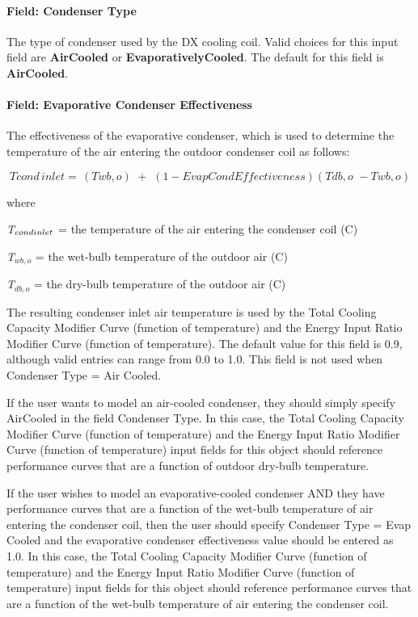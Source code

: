 \paragraph{Field: Condenser Type}\label{field-condenser-type-4}

The type of condenser used by the DX cooling coil. Valid choices for this input field are \textbf{AirCooled} or \textbf{EvaporativelyCooled}. The default for this field is \textbf{AirCooled}.

\paragraph{Field: Evaporative Condenser Effectiveness}\label{field-evaporative-condenser-effectiveness-1}

The effectiveness of the evaporative condenser, which is used to determine the temperature of the air entering the outdoor condenser coil as follows:

\begin{equation}
Tcond\,inlet = \,\left( {Twb,o} \right)\,\, + \,\,\left( {1 - EvapCondEffectiveness} \right)\left( {Tdb,o\,\, - Twb,o} \right)
\end{equation}

where

\emph{T\(_{cond\\ inlet}\)} = the temperature of the air entering the condenser coil (C)

\emph{T\(_{wb,o}\)} = the wet-bulb temperature of the outdoor air (C)

\emph{T\(_{db,o}\)} = the dry-bulb temperature of the outdoor air (C)

The resulting condenser inlet air temperature is used by the Total Cooling Capacity Modifier Curve (function of temperature) and the Energy Input Ratio Modifier Curve (function of temperature). The default value for this field is 0.9, although valid entries can range from 0.0 to 1.0. This field is not used when Condenser Type = Air Cooled.

If the user wants to model an air-cooled condenser, they should simply specify AirCooled in the field Condenser Type. In this case, the Total Cooling Capacity Modifier Curve (function of temperature) and the Energy Input Ratio Modifier Curve (function of temperature) input fields for this object should reference performance curves that are a function of outdoor dry-bulb temperature.

If the user wishes to model an evaporative-cooled condenser AND they have performance curves that are a function of the wet-bulb temperature of air entering the condenser coil, then the user should specify Condenser Type = Evap Cooled and the evaporative condenser effectiveness value should be entered as 1.0. In this case, the Total Cooling Capacity Modifier Curve (function of temperature) and the Energy Input Ratio Modifier Curve (function of temperature) input fields for this object should reference performance curves that are a function of the wet-bulb temperature of air entering the condenser coil.

